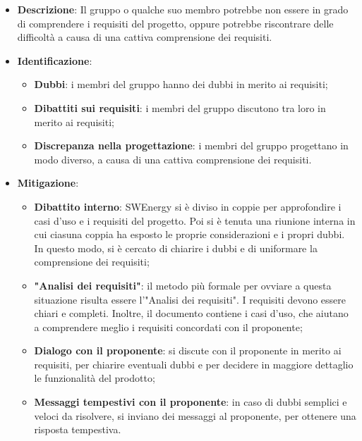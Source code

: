 \label{risk:comprensione dei requisiti carente}
\begin{itemize}
	\item \textbf{Descrizione}:
	      Il gruppo o qualche suo membro potrebbe non essere in grado di
	      comprendere i requisiti del progetto, oppure potrebbe riscontrare
	      delle difficoltà a causa di una cattiva comprensione dei requisiti.
	\item \textbf{Identificazione}:
	      \begin{itemize}
		      \item \textbf{Dubbi}: i membri del gruppo hanno dei dubbi in merito ai
		            requisiti;

		      \item \textbf{Dibattiti sui requisiti}: i membri del gruppo
		            discutono tra loro in merito ai requisiti;

		      \item \textbf{Discrepanza nella progettazione}: i membri del
		            gruppo progettano in modo diverso, a causa di una cattiva
		            comprensione dei requisiti.
	      \end{itemize}

	\item \textbf{Mitigazione}:
	      \begin{itemize}
		      \item \textbf{Dibattito interno}: SWEnergy si è diviso in coppie
		            per approfondire i casi d'uso e i requisiti del progetto.
		            Poi si è tenuta una riunione interna in cui ciasuna coppia
		            ha esposto  le proprie considerazioni e i propri dubbi. In
		            questo modo, si è cercato di chiarire i dubbi e di
		            uniformare la comprensione dei requisiti;

		      \item \textbf{"Analisi dei requisiti"}: il metodo più formale per
		            ovviare a questa situazione risulta essere
		            l'"Analisi dei requisiti".
		            I requisiti devono essere chiari e completi. Inoltre,
		            il documento contiene i casi d'uso, che aiutano a
		            comprendere meglio i requisiti concordati con il proponente;

		      \item \textbf{Dialogo con il proponente}: si discute con il proponente in
		            merito ai requisiti, per chiarire eventuali dubbi e per
		            decidere in maggiore dettaglio le funzionalità del prodotto;

		      \item \textbf{Messaggi tempestivi con il proponente}: in caso di dubbi
		            semplici e veloci da risolvere, si inviano dei messaggi al
		            proponente, per ottenere una risposta tempestiva.
	      \end{itemize}
\end{itemize}
